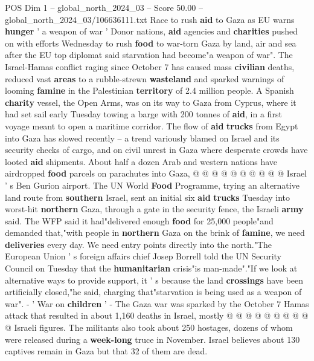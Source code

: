 \begin{textsample}{POS Dim 1 – global\_north\_2024\_03 – Score 50.00 – global\_north\_2024\_03/106636111.txt}  \label{ex:f1_pos_053}
Race to rush \textbf{aid} to Gaza as EU warns \textbf{hunger} ' a weapon of war ' Donor nations, \textbf{aid} agencies and \textbf{charities} pushed on with efforts Wednesday to rush \textbf{food} to war-torn Gaza by land, air and sea after the EU top diplomat said starvation had become"a weapon of war".
The Israel-Hamas conflict raging since October 7 has caused mass \textbf{civilian} deaths, reduced vast \textbf{areas} to a rubble-strewn \textbf{wasteland} and sparked warnings of looming \textbf{famine} in the Palestinian \textbf{territory} of 2.4 million people.
A Spanish \textbf{charity} vessel, the Open Arms, was on its way to Gaza from Cyprus, where it had set sail early Tuesday towing a barge with 200 tonnes of \textbf{aid}, in a first voyage meant to open a maritime corridor.
The flow of \textbf{aid} \textbf{trucks} from Egypt into Gaza has slowed recently -- a trend variously blamed on Israel and its security checks of cargo, and on civil unrest in Gaza where desperate crowds have looted \textbf{aid} shipments.
About half a dozen Arab and western nations have airdropped \textbf{food} parcels on parachutes into Gaza, @ @ @ @ @ @ @ @ @ @ Israel ' s Ben Gurion airport.
The UN World \textbf{Food} Programme, trying an alternative land route from \textbf{southern} Israel, sent an initial six \textbf{aid} \textbf{trucks} Tuesday into worst-hit \textbf{northern} Gaza, through a gate in the security fence, the Israeli \textbf{army} said.
The WFP said it had"delivered enough \textbf{food} for 25,000 people"and demanded that,"with people in \textbf{northern} Gaza on the brink of \textbf{famine}, we need \textbf{deliveries} every day.
We need entry points directly into the north."The European Union ' s foreign affairs chief Josep Borrell told the UN Security Council on Tuesday that the \textbf{humanitarian} crisis"is man-made"."If we look at alternative ways to provide support, it ' s because the land \textbf{crossings} have been artificially closed,"he said, charging that"starvation is being used as a weapon of war". - ' War on \textbf{children} ' - The Gaza war was sparked by the October 7 Hamas attack that resulted in about 1,160 deaths in Israel, mostly @ @ @ @ @ @ @ @ @ @ Israeli figures.
The militants also took about 250 hostages, dozens of whom were released during a \textbf{week-long} truce in November.
Israel believes about 130 captives remain in Gaza but that 32 of them are dead.

\end{textsample}
